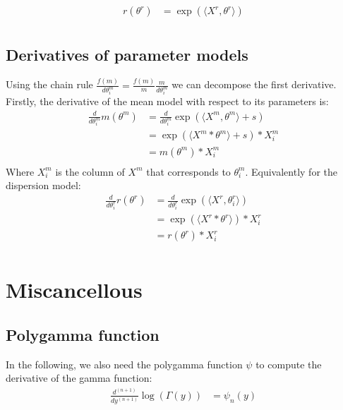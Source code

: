 \documentclass[bibliography=totoc,10pt]{scrartcl}
\begin{document}
\begin{equation}
\begin{split}
r(\theta^r) &= \exp(\langle X^r, \theta^r \rangle) \\
\end{split}
\end{equation}

\subsection{Derivatives of parameter models}
Using the chain rule $\frac{f(m)}{d \theta^m_i}=\frac{f(m)}{m}\frac{m}{d \theta^m_i}$ we can decompose the first derivative. Firstly, the derivative of the mean model with respect to its parameters is:
\begin{equation}
\begin{split}
\frac{d}{d \theta^m_i} m(\theta^m) &= \frac{d}{d \theta^m_i} \exp(\langle X^m, \theta^m \rangle + s) \\
&= \exp(\langle X^m * \theta^m \rangle + s) * X^m_{i}  \\
&= m(\theta^m) * X^m_{i}  \\
\end{split}
\end{equation}
Where $X^m_{i}$ is the column of $X^m$ that corresponds to $\theta^m_i$. Equivalently for the dispersion model: 
\begin{equation}
\begin{split}
\frac{d}{d \theta^r_i} r( \theta^r) &= \frac{d}{d \theta^r_i} \exp(\langle X^r, \theta^r_i \rangle) \\
&= \exp(\langle X^r * \theta^r \rangle) * X^r_{i}  \\
&= r(\theta^r) * X^r_{i}  \\
\end{split}
\end{equation}

\section{Miscancellous}
\subsection{Polygamma function}
In the following, we also need the polygamma function $\psi$ to compute the derivative of the gamma function:
\begin{equation}
\begin{split}
\frac{d^{(n+1)}}{d y^{(n+1)}} \log(\Gamma(y)) &= \psi_n(y) \\
\end{split}
\end{equation}
\end{document}
